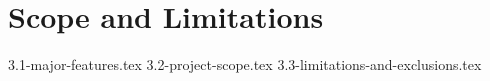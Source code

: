 \section{Scope and Limitations}

{3.1-major-features.tex}
{3.2-project-scope.tex}
{3.3-limitations-and-exclusions.tex}
